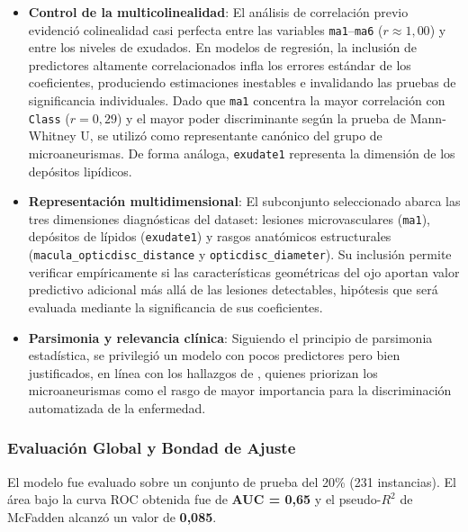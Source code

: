 \begin{itemize}
    \item \textbf{Control de la multicolinealidad}: El análisis de correlación previo
    evidenció colinealidad casi perfecta entre las variables \texttt{ma1}--\texttt{ma6}
    ($r \approx 1{,}00$) y entre los niveles de exudados. En modelos de regresión,
    la inclusión de predictores altamente correlacionados infla los errores estándar
    de los coeficientes, produciendo estimaciones inestables e invalidando las pruebas
    de significancia individuales. Dado que \texttt{ma1} concentra la mayor correlación
    con \texttt{Class} ($r = 0{,}29$) y el mayor poder discriminante según la prueba
    de Mann-Whitney U, se utilizó como representante canónico del grupo de
    microaneurismas. De forma análoga, \texttt{exudate1} representa la dimensión de
    los depósitos lipídicos.

    \item \textbf{Representación multidimensional}: El subconjunto seleccionado abarca
    las tres dimensiones diagnósticas del dataset: lesiones microvasculares
    (\texttt{ma1}), depósitos de lípidos (\texttt{exudate1}) y rasgos anatómicos
    estructurales (\texttt{macula\_opticdisc\_distance} y \texttt{opticdisc\_diameter}).
    Su inclusión permite verificar empíricamente si las características geométricas
    del ojo aportan valor predictivo adicional más allá de las lesiones detectables,
    hipótesis que será evaluada mediante la significancia de sus coeficientes.

    \item \textbf{Parsimonia y relevancia clínica}: Siguiendo el principio de parsimonia
    estadística, se privilegió un modelo con pocos predictores pero bien justificados,
    en línea con los hallazgos de \textcite{casanova2014application}, quienes priorizan
    los microaneurismas como el rasgo de mayor importancia para la discriminación
    automatizada de la enfermedad.
\end{itemize}

\subsubsection{Evaluación Global y Bondad de Ajuste}

El modelo fue evaluado sobre un conjunto de prueba del 20\% (231 instancias). El área
bajo la curva ROC obtenida fue de \textbf{AUC = 0,65} y el pseudo-$R^{2}$ de McFadden
alcanzó un valor de \textbf{0,085}.

